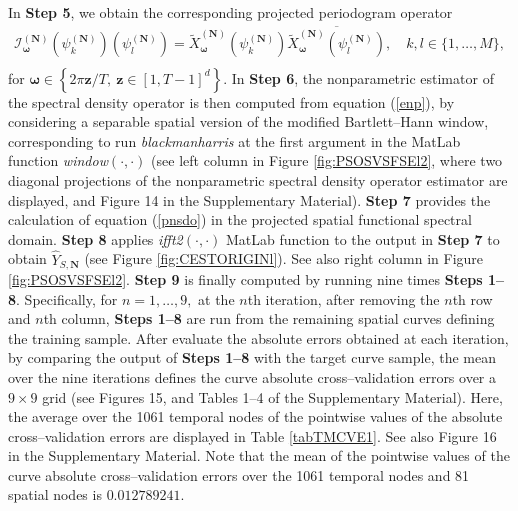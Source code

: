 \documentclass[11pt,a4paper]{article}
\begin{document}
In \textbf{Step 5}, we obtain the corresponding projected periodogram operator
\begin{eqnarray}
\mathcal{I}^{(\mathbf{N})}_{\boldsymbol{\omega}}(\psi_{k}^{(\mathbf{N})})(\psi_{l}^{(\mathbf{N})})=\widetilde{X}_{\boldsymbol{\omega}}^{(\mathbf{N})}(\psi_{k}^{(\mathbf{N})})
\overline{\widetilde{X}_{\boldsymbol{\omega}}^{(\mathbf{N})}(\psi_{l}^{(\mathbf{N})})},\quad  k,l\in \{1,\dots,M\},\nonumber\\
\end{eqnarray}\noindent for $\boldsymbol{\omega} \in \left\{2\pi \mathbf{z}/T,\ \mathbf{z}\in [1,T-1]^{d}\right\}.$ In \textbf{Step 6}, the nonparametric estimator of the spectral density operator is then computed from equation (\ref{enp}), by considering a separable spatial version of the modified  Bartlett--Hann window, corresponding to  run \emph{blackmanharris} at the first argument in  the MatLab function
\emph{window}$(\cdot,\cdot )$  (see left column in Figure \ref{fig:PSOSVSFSEl2}, where two diagonal projections of the  nonparametric spectral density operator estimator are displayed, and Figure 14 in the Supplementary Material).
 \textbf{Step 7} provides the calculation of  equation (\ref{pnsdo}) in the projected spatial functional spectral domain.
\textbf{Step 8} applies \emph{ifft2}$(\cdot,\cdot)$ MatLab function to the output in \textbf{Step 7} to obtain   $\widehat{Y}_{S,\mathbf{N}}$ (see Figure
\ref{fig:CESTORIGINl}).  See also right column in  Figure \ref{fig:PSOSVSFSEl2}.
  \textbf{Step 9} is finally computed by running nine times \textbf{Steps 1--8}. Specifically, for  $n=1,\dots, 9,$ at the $n$th iteration, after removing the $n$th row and $n$th column,   \textbf{Steps 1--8}  are run from the remaining spatial curves  defining  the training sample.  After evaluate the absolute errors obtained at each iteration, by comparing the output of  \textbf{Steps 1--8}  with the  target curve sample, the mean over the nine iterations defines the curve absolute cross--validation errors over  a $9\times 9$ grid (see Figures 15, and Tables 1--4 of the Supplementary Material). Here, the average over the 1061 temporal nodes of the  pointwise values  of the absolute  cross--validation errors   are displayed in Table \ref{tabTMCVE1}. See also Figure 16 in the Supplementary Material.
   Note that the mean   of the  pointwise values of the curve absolute cross--validation errors  over the 1061 temporal nodes and 81 spatial nodes is $\mathbf{0.012789241}.$
\vspace*{-3.5cm}
\end{document}
